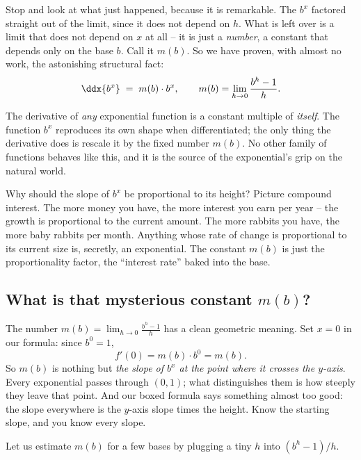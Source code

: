 Stop and look at what just happened, because it is remarkable. The $b^x$
factored straight out of the limit, since it does not depend on $h$. What is
left over is a limit that does not depend on $x$ at all -- it is just a
\emph{number}, a constant that depends only on the base $b$. Call it $m(b)$.
So we have proven, with almost no work, the astonishing structural fact:
\[
   \ddx{b^x} \;=\; m(b)\cdot b^x,
   \qquad
   m(b) = \lim_{h \to 0}\frac{b^h - 1}{h}.
\]

\begin{focusbox}
The derivative of \emph{any} exponential function is a constant multiple of
\emph{itself}. The function $b^x$ reproduces its own shape when
differentiated; the only thing the derivative does is rescale it by the
fixed number $m(b)$. No other family of functions behaves like this, and it
is the source of the exponential's grip on the natural world.
\end{focusbox}

\begin{intuitionbox}
Why should the slope of $b^x$ be proportional to its height? Picture
compound interest. The more money you have, the more interest you earn per
year -- the growth is proportional to the current amount. The more rabbits
you have, the more baby rabbits per month. Anything whose rate of change is
proportional to its current size is, secretly, an exponential. The constant
$m(b)$ is just the proportionality factor, the ``interest rate'' baked into
the base.
\end{intuitionbox}

\subsection{What is that mysterious constant $m(b)$?}

The number $m(b) = \lim_{h\to 0}\frac{b^h-1}{h}$ has a clean geometric
meaning. Set $x = 0$ in our formula: since $b^0 = 1$,
\[
   f'(0) = m(b)\cdot b^0 = m(b).
\]
So $m(b)$ is nothing but \emph{the slope of $b^x$ at the point where it
crosses the $y$-axis}. Every exponential passes through $(0,1)$; what
distinguishes them is how steeply they leave that point. And our boxed
formula says something almost too good: the slope everywhere is the
$y$-axis slope times the height. Know the starting slope, and you know every
slope.

Let us estimate $m(b)$ for a few bases by plugging a tiny $h$ into
$(b^h-1)/h$.

